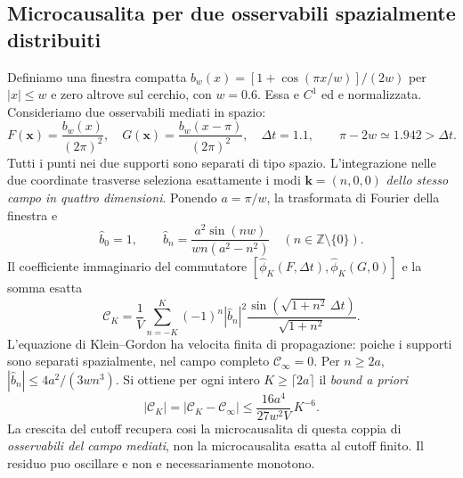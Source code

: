 \documentclass[11pt,a4paper]{article}
\begin{document}
\subsection{Microcausalita per due osservabili spazialmente distribuiti}
Definiamo una finestra compatta $b_w(x)=[1+\cos(\pi x/w)]/(2w)$ per $|x|\le w$ e zero altrove sul cerchio, con $w=0.6$. Essa e $C^1$ ed e normalizzata. Consideriamo due osservabili mediati in spazio:
\begin{equation}
 F(\mathbf x)=\frac{b_w(x)}{(2\pi)^2},\quad G(\mathbf x)=\frac{b_w(x-\pi)}{(2\pi)^2},\quad \Delta t=1.1,
 \qquad \pi-2w\simeq1.942>\Delta t.
 \label{eq:r12aw-spacelike}
\end{equation}
Tutti i punti nei due supporti sono separati di tipo spazio. L'integrazione nelle due coordinate trasverse seleziona esattamente i modi $\mathbf k=(n,0,0)$ \emph{dello stesso campo in quattro dimensioni}. Ponendo $a=\pi/w$, la trasformata di Fourier della finestra e
\begin{equation}
 \widehat b_0=1,\qquad
 \widehat b_n=\frac{a^2\sin(nw)}{wn(a^2-n^2)}\quad(n\in\mathbb Z\setminus\{0\}).
 \label{eq:r12aw-fourier}
\end{equation}
Il coefficiente immaginario del commutatore $[\hat\phi_K(F,\Delta t),\hat\phi_K(G,0)]$ e la somma esatta
\begin{equation}
 \mathcal C_K=\frac1V\sum_{n=-K}^{K}(-1)^n|\widehat b_n|^2\frac{\sin(\sqrt{1+n^2}\,\Delta t)}{\sqrt{1+n^2}}.
 \label{eq:r12aw-comm}
\end{equation}
L'equazione di Klein--Gordon ha velocita finita di propagazione: poiche i supporti sono separati spazialmente, nel campo completo $\mathcal C_\infty=0$. Per $n\ge 2a$, $|\widehat b_n|\le4a^2/(3wn^3)$. Si ottiene per ogni intero $K\ge\lceil2a\rceil$ il \emph{bound a priori}
\begin{equation}
 \boxed{|\mathcal C_K|=|\mathcal C_K-\mathcal C_\infty|
 \le\frac{16a^4}{27w^2V}\,K^{-6}.}
 \label{eq:r12aw-micro-bound}
\end{equation}
La crescita del cutoff recupera cosi la microcausalita di questa coppia di \emph{osservabili del campo mediati}, non la microcausalita esatta al cutoff finito. Il residuo puo oscillare e non e necessariamente monotono.
\end{document}
